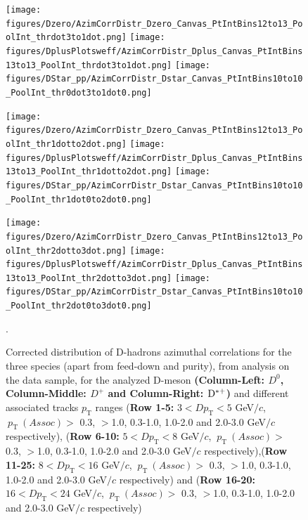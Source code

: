 \begin{figure}[!htbp]
\centering
{\texttt{[image: figures/Dzero/AzimCorrDistr\_Dzero\_Canvas\_PtIntBins12to13\_PoolInt\_thrdot3to1dot.png]}}
{\texttt{[image: figures/DplusPlotsweff/AzimCorrDistr\_Dplus\_Canvas\_PtIntBins13to13\_PoolInt\_thrdot3to1dot.png]}}
{\texttt{[image: figures/DStar\_pp/AzimCorrDistr\_Dstar\_Canvas\_PtIntBins10to10\_PoolInt\_thr0dot3to1dot0.png]}}


{\texttt{[image: figures/Dzero/AzimCorrDistr\_Dzero\_Canvas\_PtIntBins12to13\_PoolInt\_thr1dotto2dot.png]}}
{\texttt{[image: figures/DplusPlotsweff/AzimCorrDistr\_Dplus\_Canvas\_PtIntBins13to13\_PoolInt\_thr1dotto2dot.png]}}
{\texttt{[image: figures/DStar\_pp/AzimCorrDistr\_Dstar\_Canvas\_PtIntBins10to10\_PoolInt\_thr1dot0to2dot0.png]}}

{\texttt{[image: figures/Dzero/AzimCorrDistr\_Dzero\_Canvas\_PtIntBins12to13\_PoolInt\_thr2dotto3dot.png]}}
{\texttt{[image: figures/DplusPlotsweff/AzimCorrDistr\_Dplus\_Canvas\_PtIntBins13to13\_PoolInt\_thr2dotto3dot.png]}}
{\texttt{[image: figures/DStar\_pp/AzimCorrDistr\_Dstar\_Canvas\_PtIntBins10to10\_PoolInt\_thr2dot0to3dot0.png]}}




\caption{Corrected distribution of D-hadrons azimuthal correlations for the three species (apart from feed-down and purity), from analysis on the data sample, for the analyzed D-meson \textbf{(Column-Left: $D^0$, Column-Middle: $D^+$ and Column-Right: ${\rm D^{*+}}$)} and different associated tracks $p_\text{T}$ ranges (\textbf{Row 1-5:} $3 < D p_\text{T} < 5$ GeV$/c$, $ \ p_\text{T}~(Assoc)>$ 0.3, $>$1.0,  0.3-1.0, 1.0-2.0 and 2.0-3.0 GeV$/c$ respectively), (\textbf{Row 6-10:} $5 < D p_\text{T} < 8$ GeV$/c$, $ \ p_\text{T}~(Assoc)>$ 0.3, $>$1.0, 0.3-1.0, 1.0-2.0 and 2.0-3.0 GeV$/c$ respectively),(\textbf{Row 11-25:} $8 < D p_\text{T} < 16$ GeV$/c$, $ \ p_\text{T}~(Assoc)>$ 0.3, $>$1.0, 0.3-1.0, 1.0-2.0 and 2.0-3.0 GeV$/c$ respectively) and (\textbf{Row 16-20:} $16 < D p_\text{T} < 24$ GeV$/c$, $ \ p_\text{T}~(Assoc)>$ 0.3, $>$1.0, 0.3-1.0, 1.0-2.0 and 2.0-3.0 GeV$/c$ respectively) }.
\label{fig:DataD0DpDs}
\end{figure}


